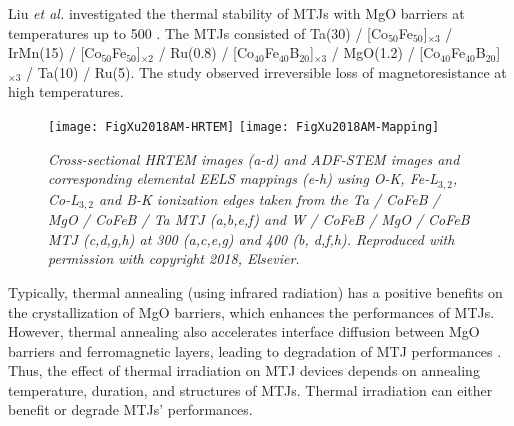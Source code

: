 \documentclass[molecules,review,submit,pdftex,moreauthors]{Definitions/mdpi}
\begin{document}
Liu \textit{et al.} investigated the thermal stability of MTJs with MgO barriers at temperatures up to \unit{500}{\celsius} \cite{Liu2006APL}.  The MTJs consisted of  Ta(30) / [Co$_{50}$Fe$_{50}$]$_{\times 3}$ / IrMn(15) / [Co$_{50}$Fe$_{50}$]$_{\times 2}$ / Ru(0.8) / [Co$_{40}$Fe$_{40}$B$_{20}$]$_{\times 3}$ / MgO(1.2) / [Co$_{40}$Fe$_{40}$B$_{20}$]$_{\times 3}$ / Ta(10) / Ru(5).  The study observed irreversible loss of magnetoresistance at high temperatures.


\begin{figure}
  \begin{center}
     \texttt{[image: FigXu2018AM-HRTEM]}  
     \texttt{[image: FigXu2018AM-Mapping]}
  \end{center}
  \caption{\textit{Cross-sectional HRTEM images (a-d) and ADF-STEM images and corresponding elemental EELS mappings (e-h) using O-K, Fe-L$_{3,2}$, Co-L$_{3,2}$ and B-K ionization edges taken from the Ta / CoFeB / MgO / CoFeB / Ta MTJ (a,b,e,f) and W /  CoFeB / MgO / CoFeB MTJ (c,d,g,h) at \unit{300}{\celsius} (a,c,e,g) and \unit{400}{\celsius} (b, d,f,h).  Reproduced with permission \cite{Xu2018AM} with copyright 2018, Elsevier.}}
  \label{Fig:Xu2018AM}
\end{figure}


Typically, thermal annealing (using infrared radiation) has a positive benefits on the crystallization of MgO barriers, which enhances the performances of MTJs.  However, thermal annealing also accelerates interface diffusion between MgO barriers and ferromagnetic layers, leading to degradation of MTJ performances \cite{Bai2013PRB}. 
Thus, the effect of thermal irradiation on MTJ devices depends on annealing temperature, duration, and structures of MTJs.  Thermal irradiation can either benefit or degrade MTJs' performances.     
\end{document}
